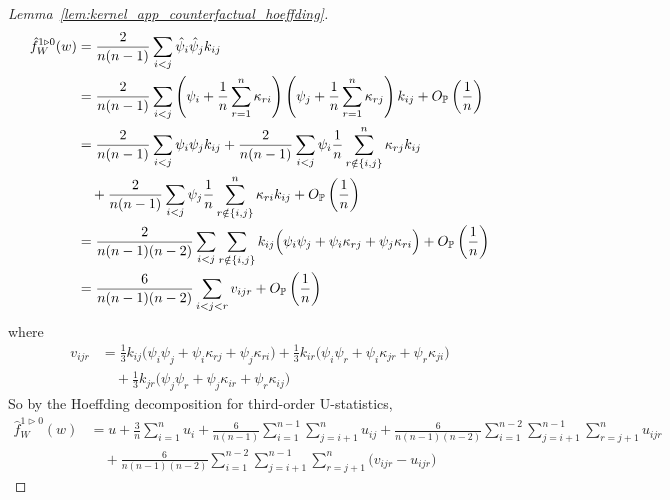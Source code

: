 \begin{proof}[Lemma~\ref{lem:kernel_app_counterfactual_hoeffding}]
  \begin{align*}
    \hat f_W^{1 \triangleright 0}(w)
    &=
    \frac{2}{n(n-1)}
    \sum_{i < j}
    \hat \psi_i
    \hat \psi_j
    k_{i j} \\
    &=
    \frac{2}{n(n-1)}
    \sum_{i < j}
    \left(
      \psi_i
      + \frac{1}{n}
      \sum_{r=1}^n \kappa_{r i}
    \right)
    \left(
      \psi_j
      + \frac{1}{n}
      \sum_{r=1}^n \kappa_{r j}
    \right)
    k_{i j}
    + O_\P\left(\frac{1}{n}\right) \\
    &=
    \frac{2}{n(n-1)}
    \sum_{i < j}
    \psi_i
    \psi_j
    k_{i j}
    + \frac{2}{n(n-1)}
    \sum_{i < j}
    \psi_i
    \frac{1}{n}
    \sum_{r \notin \{i,j\}}^n \kappa_{r j}
    k_{i j} \\
    &\quad+
    \frac{2}{n(n-1)}
    \sum_{i < j}
    \psi_j
    \frac{1}{n}
    \sum_{r \notin \{i,j\}}^n \kappa_{r i}
    k_{i j}
    + O_\P\left(\frac{1}{n}\right) \\
    &=
    \frac{2}{n(n-1)(n-2)}
    \sum_{i < j}
    \sum_{r \notin \{i,j\}}
    k_{i j}
    \Big(
      \psi_i
      \psi_j
      +\psi_i
      \kappa_{r j}
      +\psi_j
      \kappa_{r i}
    \Big)
    + O_\P\left(\frac{1}{n}\right) \\
    &=
    \frac{6}{n(n-1)(n-2)}
    \sum_{i < j < r}
    v_{i j r}
    + O_\P\left(\frac{1}{n}\right)
  \end{align*}
  where
  \begin{align*}
    v_{i j r}
    &=
    \frac{1}{3}
    k_{i j} \Big(\psi_i \psi_j +\psi_i \kappa_{r j} +\psi_j \kappa_{r i} \Big)
    + \frac{1}{3}
    k_{i r} \Big(\psi_i \psi_r +\psi_i \kappa_{jr} +\psi_r \kappa_{j i} \Big) \\
    &\quad+
    \frac{1}{3}
    k_{jr} \Big(\psi_j \psi_r +\psi_j \kappa_{i r} +\psi_r \kappa_{i j} \Big)
  \end{align*}
  So by the Hoeffding decomposition for third-order U-statistics,
  \begin{align*}
    \hat f_W^{1 \triangleright 0}(w)
    &=
    u
    + \frac{3}{n}
    \sum_{i=1}^n
    u_i
    + \frac{6}{n(n-1)}
    \sum_{i=1}^{n-1}
    \sum_{j=i+1}^n
    u_{i j}
    + \frac{6}{n(n-1)(n-2)}
    \sum_{i=1}^{n-2}
    \sum_{j=i+1}^{n-1}
    \sum_{r=j+1}^n
    u_{i j r} \\
    &\quad+
    \frac{6}{n(n-1)(n-2)}
    \sum_{i=1}^{n-2}
    \sum_{j=i+1}^{n-1}
    \sum_{r=j+1}^n
    \big(v_{i j r} - u_{i j r}\big)

\end{align*}
\end{proof}

